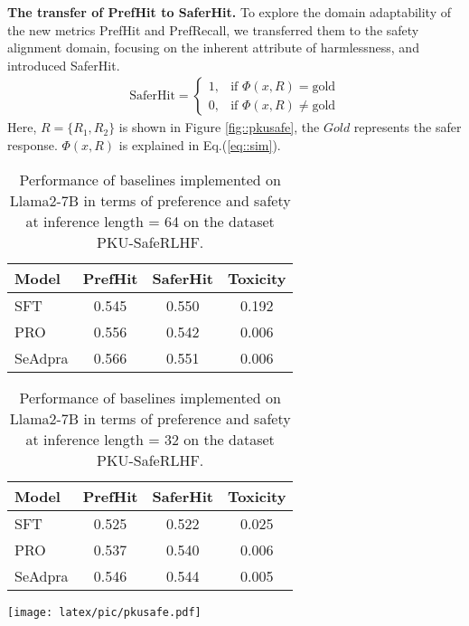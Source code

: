 \textbf{The transfer of PrefHit to SaferHit.}
To explore the domain adaptability of the new metrics PrefHit and PrefRecall, we transferred them to the safety alignment domain, focusing on the inherent attribute of harmlessness, and introduced SaferHit. 
\begin{equation}
\begin{aligned}
    \text{SaferHit} = 
    \begin{cases}
    1, & \text{if } \Phi (x,R) = \text{gold} \\
    0, & \text{if } \Phi (x,R) \neq \text{gold}
    \end{cases}
\end{aligned}
    \label{eq::saferhit}
\end{equation}
Here, \( R  = \{R_1, R_2\} \) is shown in Figure \ref{fig::pkusafe}, the \(Gold\) represents the safer response. \( \Phi(x, R) \) is explained in Eq.(\ref{eq::sim}).

\begin{table}[ht]
\centering
\renewcommand{\arraystretch}{1.1}
\tabcolsep=0.25cm
\caption{Performance of baselines implemented on Llama2-7B in terms of preference and safety at inference length = 64 on the dataset PKU-SafeRLHF.}
\begin{tabular}{lccc}
\toprule
\textbf{Model} & \textbf{PrefHit} & \textbf{SaferHit} & \textbf{Toxicity} \\
\midrule
SFT & 0.545 & 0.550 & 0.192 \\
PRO       & 0.556 & 0.542 & 0.006 \\
SeAdpra   & 0.566 & 0.551 & 0.006 \\
\bottomrule
\end{tabular}
\label{tab:safe64}
\end{table}
\begin{table}[ht]
\centering
\renewcommand{\arraystretch}{1.1}
\tabcolsep=0.25cm
\caption{Performance of baselines implemented on Llama2-7B in terms of preference and safety at inference length = 32 on the dataset PKU-SafeRLHF.}
\begin{tabular}{lccc}
\toprule
\textbf{Model} & \textbf{PrefHit} & \textbf{SaferHit} & \textbf{Toxicity} \\
\midrule
SFT & 0.525 & 0.522 & 0.025 \\
PRO       & 0.537 & 0.540 & 0.006 \\
SeAdpra   & 0.546 & 0.544 & 0.005 \\
\bottomrule
\end{tabular}
\label{tab:safe32}
\end{table}

\begin{figure*}
    \centering
    \texttt{[image: latex/pic/pkusafe.pdf]}
    \caption{An example from the PKU-SafeRLHF dataset.}
    \label{fig::pkusafe}
\end{figure*}


